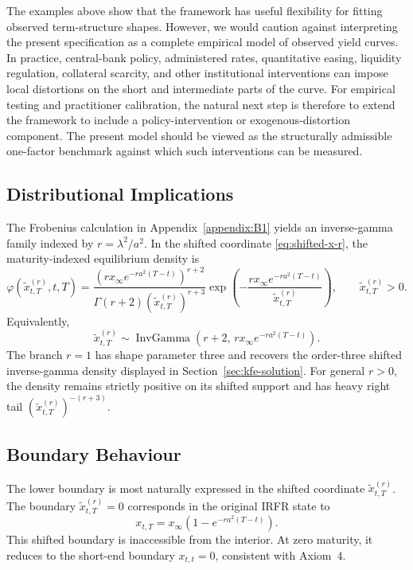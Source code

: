 \documentclass[12pt]{article}
\theoremstyle{statementstyle}
\begin{document}
The examples above show that the framework has useful flexibility for fitting observed term-structure shapes. However, we would caution against interpreting the present specification as a complete empirical model of observed yield curves. In practice, central-bank policy, administered rates, quantitative easing, liquidity regulation, collateral scarcity, and other institutional interventions can impose local distortions on the short and intermediate parts of the curve. For empirical testing and practitioner calibration, the natural next step is therefore to extend the framework to include a policy-intervention or exogenous-distortion component. The present model should be viewed as the structurally admissible one-factor benchmark against which such interventions can be measured.
\subsection{Distributional Implications}
\label{subsec:distributional}

The Frobenius calculation in Appendix~\ref{appendix:B1} yields an
inverse-gamma family indexed by \(r=\lambda^{2}/a^{2}\). In the shifted
coordinate \eqref{eq:shifted-x-r}, the maturity-indexed equilibrium
density is
\begin{equation}
\varphi(\widetilde{x}_{t,T}^{(r)},t,T)
=
\frac{
\left(r x_{\infty}e^{-ra^{2}(T-t)}\right)^{r+2}
}{
\Gamma(r+2)\left(\widetilde{x}_{t,T}^{(r)}\right)^{r+3}
}
\exp\!\left(
-\frac{r x_{\infty}e^{-ra^{2}(T-t)}}
{\widetilde{x}_{t,T}^{(r)}}
\right),
\qquad
\widetilde{x}_{t,T}^{(r)}>0.
\tag{6.5.1}\label{eq:long-time-limit-density-interpretation}
\end{equation}
Equivalently,
\[
\widetilde{x}_{t,T}^{(r)}
\sim
\operatorname{InvGamma}\left(r+2,\,
 r x_{\infty}e^{-ra^{2}(T-t)}\right).
\]
The branch \(r=1\) has shape parameter three and recovers the
order-three shifted inverse-gamma density displayed in
Section~\ref{sec:kfe-solution}. For general \(r>0\), the density remains
strictly positive on its shifted support and has heavy right tail
\((\widetilde{x}_{t,T}^{(r)})^{-(r+3)}\).

\subsection{Boundary Behaviour}
\label{subsec:econ-boundary}

The lower boundary is most naturally expressed in the shifted coordinate
\(\widetilde{x}_{t,T}^{(r)}\). The boundary
\(\widetilde{x}_{t,T}^{(r)}=0\) corresponds in the original IRFR state to
\[
x_{t,T}
=
x_{\infty}\left(1-e^{-ra^{2}(T-t)}\right).
\]
This shifted boundary is inaccessible from the interior. At zero
maturity, it reduces to the short-end boundary \(x_{t,t}=0\), consistent
with Axiom~4.
\end{document}
